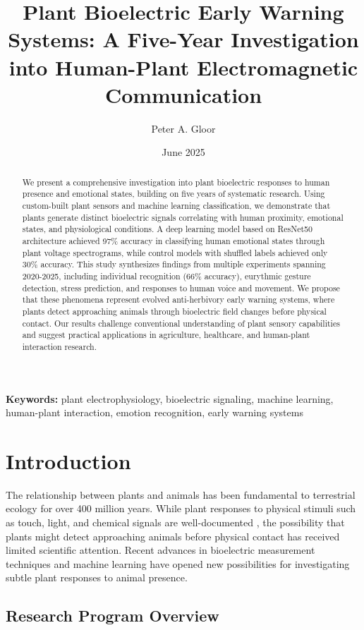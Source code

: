 \documentclass{article}
\title{Plant Bioelectric Early Warning Systems: A Five-Year Investigation into Human-Plant Electromagnetic Communication}
\author[1,2,3]{Peter A. Gloor}
\affil[1]{Galaxylabs.org, Aarau, Switzerland}
\affil[2]{University of Cologne, Cologne, Germany}
\affil[3]{MIT SDM, Cambridge MA}
\affil[ ] {\textit{pgloor@galaxylabs.org}}
\date{June 2025}
\begin{document}
\maketitle

\begin{abstract}
We present a comprehensive investigation into plant bioelectric responses to human presence and emotional states, building on five years of systematic research. Using custom-built plant sensors and machine learning classification, we demonstrate that plants generate distinct bioelectric signals correlating with human proximity, emotional states, and physiological conditions. A deep learning model based on ResNet50 architecture achieved 97\% accuracy in classifying human emotional states through plant voltage spectrograms, while control models with shuffled labels achieved only 30\% accuracy. This study synthesizes findings from multiple experiments spanning 2020-2025, including individual recognition (66\% accuracy), eurythmic gesture detection, stress prediction, and responses to human voice and movement. We propose that these phenomena represent evolved anti-herbivory early warning systems, where plants detect approaching animals through bioelectric field changes before physical contact. Our results challenge conventional understanding of plant sensory capabilities and suggest practical applications in agriculture, healthcare, and human-plant interaction research.
\end{abstract}

\noindent\textbf{Keywords:} plant electrophysiology, bioelectric signaling, machine learning, human-plant interaction, emotion recognition, early warning systems

\section{Introduction}

The relationship between plants and animals has been fundamental to terrestrial ecology for over 400 million years. While plant responses to physical stimuli such as touch, light, and chemical signals are well-documented \cite{fromm2007electrical}, the possibility that plants might detect approaching animals before physical contact has received limited scientific attention. Recent advances in bioelectric measurement techniques and machine learning have opened new possibilities for investigating subtle plant responses to animal presence.

\subsection{Research Program Overview}
\end{document}
